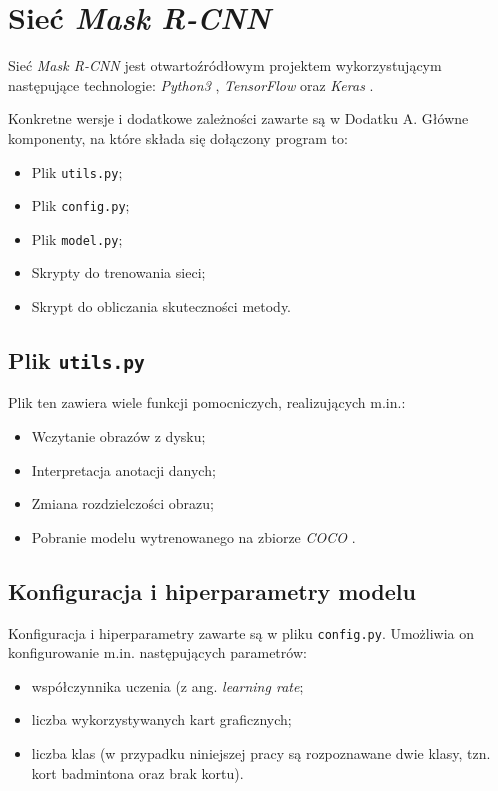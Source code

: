 \newpage
\section{Sieć \textit{Mask R-CNN}}

Sieć \textit{Mask R-CNN} \cite{matterport-mask-rcnn} jest otwartoźródłowym projektem wykorzystującym następujące technologie: \textit{Python3} \cite{python}, \textit{TensorFlow} \cite{tensorflow} oraz \textit{Keras} \cite{keras}.

Konkretne wersje i dodatkowe zależności zawarte są w Dodatku A. Główne komponenty, na które składa się dołączony program to:

\begin{itemize}
\item Plik \texttt{utils.py};
  \item Plik \texttt{config.py};
  \item Plik  \texttt{model.py};
  \item Skrypty do trenowania sieci;
  \item Skrypt do obliczania skuteczności metody.
\end{itemize}

\subsection*{Plik \texttt{utils.py}}

Plik ten zawiera wiele funkcji pomocniczych, realizujących m.in.:
\begin{itemize}
  \item Wczytanie obrazów z dysku;
  \item Interpretacja anotacji danych;
  \item Zmiana rozdzielczości obrazu;
  \item Pobranie modelu wytrenowanego na zbiorze \textit{COCO} \cite{coco}.
\end{itemize}

\subsection*{Konfiguracja i hiperparametry modelu}

Konfiguracja i hiperparametry zawarte są w pliku \texttt{config.py}. Umożliwia on konfigurowanie m.in. następujących parametrów:
\begin{itemize}
  \item współczynnika uczenia (z ang. \textit{learning rate};
  \item liczba wykorzystywanych kart graficznych;
  \item liczba klas (w przypadku niniejszej pracy są rozpoznawane dwie klasy, tzn. kort badmintona oraz brak kortu).
\end{itemize}

